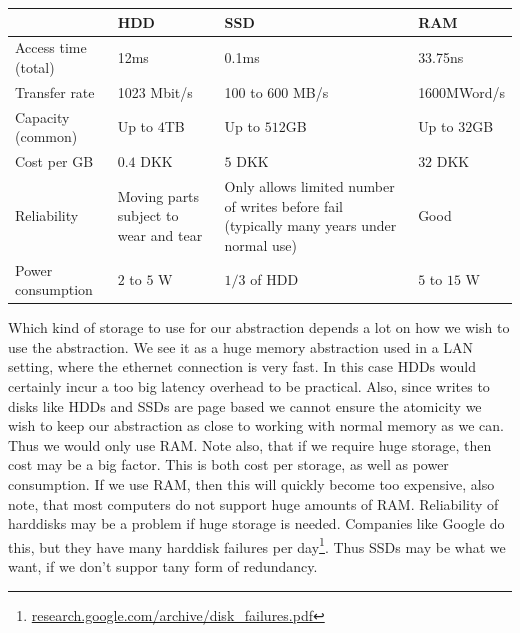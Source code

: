 \documentclass[a4paper,final]{article}
\begin{document}
\begin{table}[htbp]
    \centering
    \begin{tabular}{ l | p{} | p{} | p{} }
        \toprule
        & \textbf{HDD} & \textbf{SSD} & \textbf{RAM} \\
        \midrule
        Access time (total) & 12ms & 0.1ms & 33.75ns \\
        Transfer rate & 1023 Mbit/s & 100 to 600 MB/s & 1600MWord/s \\
        Capacity (common) & Up to $4$TB & Up to $512$GB & Up to $32$GB \\
        Cost per GB & $0.4$ DKK & $5$ DKK & $32$ DKK \\
        Reliability
            & Moving parts subject to wear and tear
            & Only allows limited number of writes before fail (typically many years under normal use)
            & Good \\
        Power consumption & $2$ to $5$ W & $1/3$ of HDD & $5$ to $15$ W \\
        \bottomrule
    \end{tabular}
\end{table}

Which kind of storage to use for our abstraction depends a lot on how we wish
to use the abstraction. We see it as a huge memory abstraction used in a LAN
setting, where the ethernet connection is very fast. In this case HDDs would
certainly incur a too big latency overhead to be practical. Also, since writes
to disks like HDDs and SSDs are page based we cannot ensure the atomicity we
wish to keep our abstraction as close to working with normal memory as we can.
Thus we would only use RAM. Note also, that if we require huge storage, then
cost may be a big factor. This is both cost per storage, as well as power
consumption. If we use RAM, then this will quickly become too expensive, also
note, that most computers do not support huge amounts of RAM. Reliability of
harddisks may be a problem if huge storage is needed. Companies like Google do
this, but they have many harddisk failures per
day\footnote{\url{research.google.com/archive/disk_failures.pdf}}. Thus
SSDs may be what we want, if we don't suppor tany form of redundancy.
\end{document}

